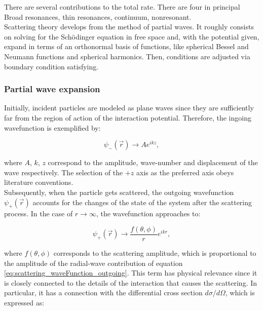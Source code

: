 \documentclass[openany]{book}
\begin{document}
 
There are several contributions  to the total rate. There are four in principal 
Broad resonances, thin resonances, continuum, nonresonant. \\

Scattering theory develops from the method of partial waves. It roughly consists on solving for the Schödinger equation in free space and, with the potential given, expand in terms of an orthonormal basis of functions, like spherical Bessel and Neumann functions and spherical harmonics. Then, conditions are adjusted via boundary condition satisfying. \\

\subsubsection{Partial wave expansion}

Initially, incident particles are modeled as plane waves since they are sufficiently far from the region of action of the interaction potential. Therefore, the ingoing wavefunction is exemplified by: 

\begin{equation} \label{eq:scattering_waveFunction_incident}
	\psi_{-}(\vec r) \rightarrow A e^{ikz}, 
\end{equation}

where $A$, $k$, $z$ correspond to the amplitude, wave-number and displacement of the wave respectively. The selection of the $+z$ axis as the preferred axis obeys literature conventions. \\

Subsequently, when the particle gets scattered, the outgoing wavefunction $\psi_{+}(\vec r)$ accounts for the changes of the state of the system after the scattering process. In the case of $r \rightarrow \infty$, the wavefunction approaches to:

\begin{equation} \label{eq:scattering_waveFunction_outgoing}
	\psi_{+}(\vec r) \rightarrow \frac{f(\theta, \phi)}{r} e^{i k r}, 
\end{equation}

where $f(\theta, \phi)$ corresponds to the scattering amplitude, which is proportional to the amplitude of the radial-wave contribution of equation \ref{eq:scattering_waveFunction_outgoing}. This term has physical relevance since it is closely connected to the details of the interaction that causes the scattering. In particular, it has a connection with the differential cross section $d\sigma / d\Omega$, which is expressed as: 
\end{document}
